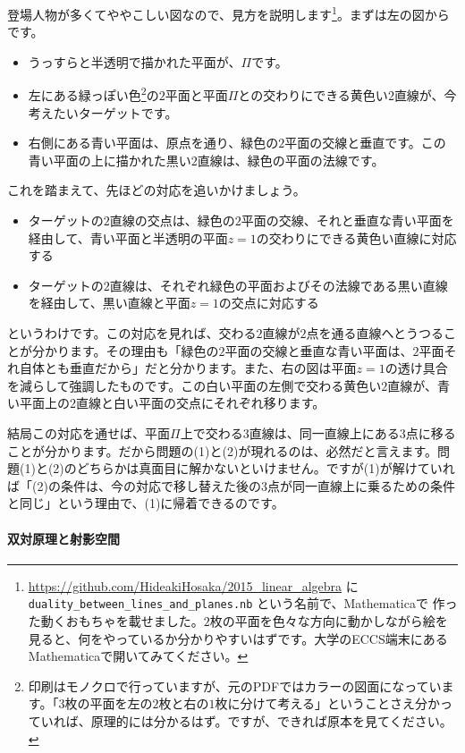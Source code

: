 登場人物が多くてややこしい図なので、見方を説明します\footnote{\url{https://github.com/HideakiHosaka/2015_linear_algebra} に \texttt{duality\_between\_lines\_and\_planes.nb} という名前で、Mathematicaで	作った動くおもちゃを載せました。$2$枚の平面を色々な方向に動かしながら絵を見ると、何をやっているか分かりやすいはずです。大学のECCS端末にあるMathematicaで開いてみてください。}。まずは左の図からです。
\begin{itemize}
\item うっすらと半透明で描かれた平面が、$\Pi$です。
\item 左にある緑っぽい色\footnote{印刷はモノクロで行っていますが、元のPDFではカラーの図面になっています。「$3$枚の平面を左の$2$枚と右の$1$枚に分けて考える」ということさえ分かっていれば、原理的には分かるはず。ですが、できれば原本を見てください。}の$2$平面と平面$\Pi$との交わりにできる黄色い$2$直線が、今考えたいターゲットです。
\item 右側にある青い平面は、原点を通り、緑色の$2$平面の交線と垂直です。この青い平面の上に描かれた黒い$2$直線は、緑色の平面の法線です。
\end{itemize}
これを踏まえて、先ほどの対応を追いかけましょう。
\begin{itemize}
\item ターゲットの$2$直線の交点は、緑色の$2$平面の交線、それと垂直な青い平面を経由して、青い平面と半透明の平面$z = 1$の交わりにできる黄色い直線に対応する
\item ターゲットの$2$直線は、それぞれ緑色の平面およびその法線である黒い直線を経由して、黒い直線と平面$z = 1$の交点に対応する
\end{itemize}
というわけです。この対応を見れば、交わる$2$直線が$2$点を通る直線へとうつることが分かります。その理由も「緑色の$2$平面の交線と垂直な青い平面は、$2$平面それ自体とも垂直だから」だと分かります。また、右の図は平面$z = 1$の透け具合を減らして強調したものです。この白い平面の左側で交わる黄色い$2$直線が、青い平面上の$2$直線と白い平面の交点にそれぞれ移ります。

結局この対応を通せば、平面$\Pi$上で交わる$3$直線は、同一直線上にある$3$点に移ることが分かります。だから問題の(1)と(2)が現れるのは、必然だと言えます。問題(1)と(2)のどちらかは真面目に解かないといけません。ですが(1)が解けていれば「(2)の条件は、今の対応で移し替えた後の$3$点が同一直線上に乗るための条件と同じ」という理由で、(1)に帰着できるのです。

\paragraph{双対原理と射影空間}

